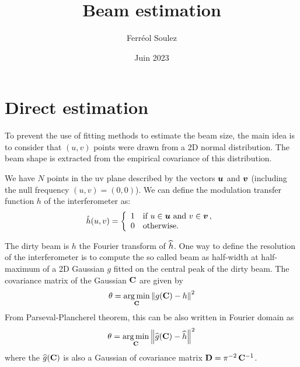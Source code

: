 \documentclass[a4paper,11pt,twoside]{scrartcl}
\title{Beam estimation}
\author{Ferréol Soulez }
\date{Juin 2023}
\begin{document}
\maketitle

\section{Direct estimation}

To prevent the use of fitting methods to estimate the beam size, the main idea is to consider that $(u,v)$ points were drawn from a 2D normal distribution. The  beam shape is extracted from the empirical covariance of this distribution.



We have $N$ points in the uv plane described by the vectors $\boldsymbol{u}$ and $\boldsymbol{v}$ (including the null frequency  $(u,v) = (0,0)$). We can define the modulation transfer function $h$ of the interferometer  as:
\begin{equation}
	\hat{h}(u, v) = \left\{
		\begin{array}{ll}
		1 &\text{if } u \in \boldsymbol{u} \text{ and } v \in \boldsymbol{v}\,,\\
		0 &\text{otherwise.}
	\end{array} \right.
\end{equation} 

The dirty beam is $h$  the Fourier transform of $\widehat{h}$. One way to define the resolution of the interferometer is to compute the so called beam as half-width at half-maximum of a 2D Gaussian $g$ fitted on the central peak of the dirty beam. The covariance matrix of the Gaussian $\mathbf{C}$ are given by
\begin{equation}
	\theta =  \argmin_{\M C} \Norm{ g(\M C) - h}^2 
\end{equation}
From  Parseval-Plancherel theorem, this can be also written in Fourier domain as
\begin{equation}
	\theta =  \argmin_{\M C} \Norm{\FT{g}(\M C) - \FT{h}}^2 
\end{equation}
where the $\widehat{g}(\mathbf{C})$ is also a Gaussian of covariance matrix $\mathbf{D} = \pi^{-2}\,\mathbf{C}^{-1}$.
\end{document}
